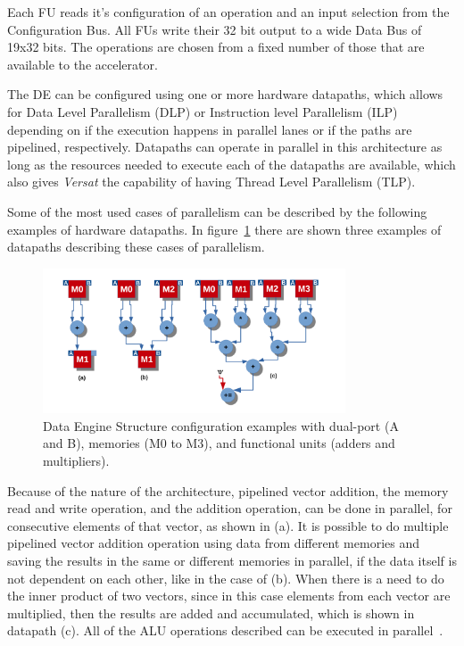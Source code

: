 Each {\sc FU} reads it's configuration of an operation and an input selection
from the Configuration Bus.  All {\sc FUs} write their 32 bit output to a wide
Data Bus of 19x32 bits.  The operations are chosen from a fixed number of those
that are available to the accelerator.

The {\sc DE} can be configured using one or more hardware datapaths, which
allows for Data Level Parallelism ({\sc DLP}) or Instruction level Parallelism
({\sc ILP}) depending on if the execution happens in parallel lanes or if the
paths are pipelined, respectively. Datapaths can operate in parallel in this
architecture as long as the resources needed to execute each of the datapaths are
available, which also gives {\it Versat} the capability of having Thread Level
Parallelism ({\sc TLP}).

Some of the most used cases of parallelism can be described by the following
examples of hardware datapaths.  In figure~\ref{fig:de_datapaths} there are
shown three examples of datapaths describing these cases of parallelism.

\begin{figure}[!htbp]
    \centerline{\includegraphics[width=0.8\textwidth]{Figures/de_datapaths.png}}
		\vspace{0cm}\caption{Data Engine Structure configuration examples with dual-port
		(A and B), memories (M0 to M3), and functional units (adders and multipliers).}
    \label{fig:de_datapaths}
\end{figure}

Because of the nature of the architecture, pipelined vector addition, the memory
read and write operation, and the addition operation, can be done in parallel, for
consecutive elements of that vector, as shown in (a).  It is possible to do
multiple pipelined vector addition operation using data from different memories
and saving the results in the same or different memories in parallel, if the
data itself is not dependent on each other, like in the case of (b).  When there
is a need to do the inner product of two vectors, since in this case elements
from each vector are multiplied, then the results are added and accumulated,
which is shown in datapath (c).  All of the {\sc ALU} operations described can
be executed in parallel~\cite{Lopes2017}.

